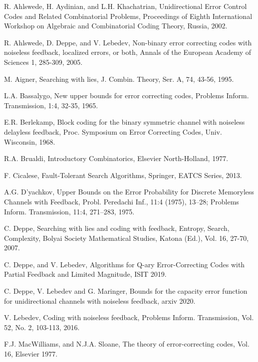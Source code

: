 \documentclass[conference]{IEEEtran}
\begin{document}
\begin{thebibliography}{xxx}
	
	 R. Ahlswede, H. Aydinian, and L.H. Khachatrian,
	Unidirectional Error Control Codes and Related Combinatorial Problems,
	Proceedings of Eighth International Workshop on Algebraic and Combinatorial Coding Theory, Russia, 2002.
	
	 R. Ahlswede, D. Deppe, and V. Lebedev,
	Non-binary error correcting codes with noiseless feedback, localized errors, or both, 
	Annals of the European Academy of Sciences 1, 285-309, 2005.
	
	 M. Aigner, Searching with lies, J. Combin. Theory, Ser. A, 74, 43-56, 1995. 
	
	 L.A. Bassalygo,
	New upper bounds for error correcting codes,
	Problems Inform. Transmission, 1:4, 32-35, 1965.
	
	E.R. Berlekamp, Block coding for the binary symmetric channel with
	noiseless delayless feedback, Proc. Symposium on Error Correcting
	Codes, Univ. Wisconsin, 1968.
	
	  R.A. Brualdi, Introductory Combinatorics, Elsevier North-Holland, 1977.
	
	 F. Cicalese,
	Fault-Tolerant Search Algorithms,
	Springer, EATCS Series, 2013.
	
	 A.G. D'yachkov, 
	Upper Bounds on the Error Probability for Discrete Memoryless Channels with Feedback, Probl. Peredachi Inf., 11:4 (1975), 13–28; Problems Inform. Transmission, 11:4, 271–283, 1975.
	
	 C. Deppe,
	Searching with lies and coding with feedback,
	Entropy, Search, Complexity, Bolyai Society Mathematical Studies, Katona (Ed.), Vol. 16, 27-70, 2007.
	
	 C. Deppe, and V. Lebedev,
	Algorithms for Q-ary Error-Correcting Codes with Partial Feedback and Limited Magnitude, ISIT 2019.
	
	 C. Deppe, V. Lebedev and G. Maringer,
	Bounds for the capacity error function for unidirectional channels with noiseless feedback, arxiv 2020.
	
	 V. Lebedev, 
	Coding with noiseless feedback,
	Problems Inform. Transmission, Vol. 52, No. 2, 103-113, 2016.
	
	 F.J. MacWilliams, and N.J.A. Sloane,
    The theory of error-correcting codes, Vol. 16, Elsevier 1977.


\end{thebibliography}
\end{document}
